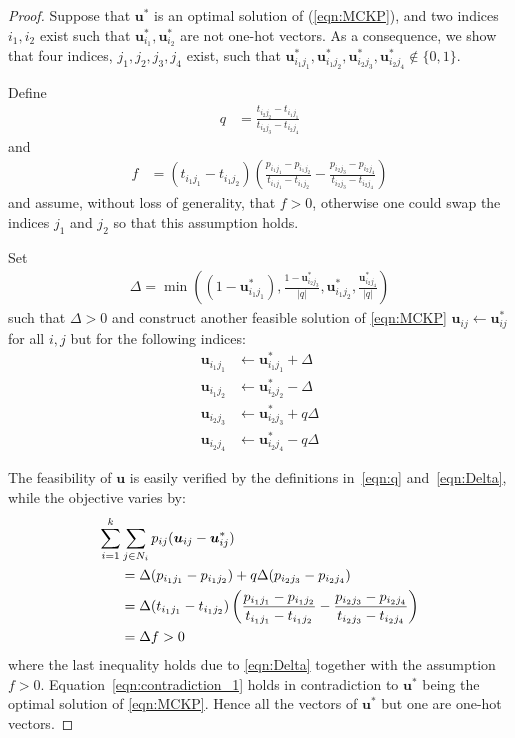 \documentclass[dvipsnames,table,xcdraw]{article}
\newcommand{\mb}[1]{{\boldsymbol{#1}}}
\newcommand{\vu}{\mb{u}}
\begin{document}
\begin{proof}
Suppose that $\vu^*$ is an optimal solution of (\ref{eqn:MCKP}), 
 and two indices $i_1, i_2$ exist such that $\vu_{i_1}^*, \vu_{i_2}^*$ are not one-hot vectors. As a consequence, we show that four indices, $j_1, j_2, j_3, j_4$ exist, such that $\vu_{i_1 j_1}^*, \vu_{i_1 j_2}^*, \vu_{i_2 j_3}^*, \vu_{i_2 j_4}^*\notin\{0,1\}$. 
 
 Define
 \begin{align}\label{eqn:q}
 q&=\frac{t_{i_2 j_2}-t_{i_1 j_1}}{t_{i_2 j_3}-t_{i_2 j_4}} 
 \end{align}
 and
 \begin{align*}
 f&=(t_{i_1 j_1}-t_{i_1 j_2})\left(\frac{p_{i_1 j_1}-p_{i_1 j_2}}{t_{i_1 j_1}-t_{i_1 j_2}}-\frac{p_{i_2 j_3}-p_{i_2 j_4}}{t_{i_2 j_3}-t_{i_2 j_4}}\right)
 \end{align*}
 and assume, without loss of generality, that $f>0$, otherwise one could swap the indices $j_1$ and $j_2$ so that this assumption holds.
 
Set
\begin{align}\label{eqn:Delta}
\Delta= \min\left((1-\vu_{i_1 j_1}^*), \frac{1 - \vu_{i_2 j_3}^*}{|q|}, \vu_{i_1 j_2}^*,  \frac{\vu_{i_2 j_4}^*}{|q|}\right)
\end{align}
such that $\Delta>0$ and construct another feasible solution of \eqref{eqn:MCKP} $\vu_{ij}\leftarrow\vu_{ij}^*$  for all $i,j$ but for the following indices:
\begin{align*}
\vu_{i_1 j_1} &\leftarrow\vu_{i_1 j_1}^*+\Delta \\
    \vu_{i_1 j_2} &\leftarrow\vu_{i_2 j_2}^*-\Delta \\
    \vu_{i_2 j_3} &\leftarrow\vu_{i_2 j_3}^*+q\Delta \\
    \vu_{i_2 j_4} &\leftarrow\vu_{i_2 j_4}^*-q\Delta
\end{align*}


 The feasibility of $\vu$ is easily verified by the definitions in~\eqref{eqn:q} and~\eqref{eqn:Delta}, while the objective varies by:
 \begin{align}
 \notag
 \sum_{i=1}^k& \sum_{j\in N_i}  p_{ij} (\vu_{ij}-\vu_{ij}^*)
 \\\notag
 &= \Delta (p_{i_1 j_1}-p_{i_1 j_2})+q\Delta(p_{i_2 j_3}-p_{i_2 j_4})
 \\\notag
     &=\Delta (t_{i_1 j_1}-t_{i_1 j_2})\left(\frac{p_{i_1 j_1}-p_{i_1 j_2}}{t_{i_1 j_1}-t_{i_1 j_2}}-\frac{p_{i_2 j_3}-p_{i_2 j_4}}{t_{i_2 j_3}-t_{i_2 j_4}}\right)
     \\
     &=\Delta f >0 \label{eqn:contradiction_1}
 \end{align}
 where the last inequality holds due to \eqref{eqn:Delta} together with the assumption $f>0$. Equation~\eqref{eqn:contradiction_1} holds in contradiction to $\vu^*$ being the optimal solution of \eqref{eqn:MCKP}. Hence all the vectors of $\vu^*$ but one are one-hot vectors.
\end{proof}
\end{document}
